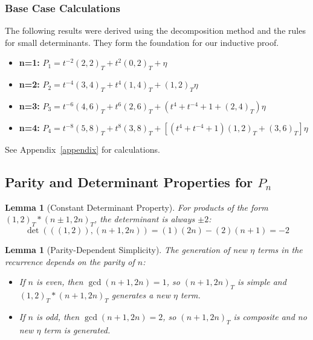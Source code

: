 \documentclass[12pt]{article}
\newtheorem{lemma}[theorem]{Lemma}
\begin{document}
\subsubsection*{Base Case Calculations}
The following results were derived using the decomposition method and the rules for small determinants. They form the foundation for our inductive proof.

\begin{itemize}
    \item \textbf{n=1:} $P_1 = t^{-2}(2,2)_T + t^{2}(0,2)_T + \eta$
    \item \textbf{n=2:} $P_2 = t^{-4}(3,4)_T + t^{4}(1,4)_T + (1,2)_T\eta$
    \item \textbf{n=3:} $P_3 = t^{-6}(4,6)_T + t^{6}(2,6)_T + (t^4 + t^{-4} + 1 + (2,4)_T)\eta$
    \item \textbf{n=4:} $P_4 = t^{-8}(5,8)_T + t^{8}(3,8)_T + [ (t^4 + t^{-4} + 1)(1,2)_T + (3,6)_T ]\eta$
\end{itemize}
See Appendix~\ref{appendix} for calculations.



\subsection{Parity and Determinant Properties for $P_n$}
\begin{lemma}[Constant Determinant Property]\label{lem:property}
For products of the form $(1,2)_T \ast (n \pm 1, 2n)_T$, the determinant is always $\pm 2$:
\begin{equation}
\det(((1,2)), (n+1, 2n)) = (1)(2n) - (2)(n+1) = -2
\end{equation}
\end{lemma}

\begin{lemma}[Parity-Dependent Simplicity]\label{lem:parity}
The generation of new $\eta$ terms in the recurrence depends on the parity of $n$:
\begin{itemize}
    \item If $n$ is even, then $\gcd(n+1, 2n) = 1$, so $(n+1, 2n)_T$ is simple and $(1,2)_T \ast (n+1, 2n)_T$ generates a new $\eta$ term.
    \item If $n$ is odd, then $\gcd(n+1, 2n) = 2$, so $(n+1, 2n)_T$ is composite and no new $\eta$ term is generated.
\end{itemize}
\end{lemma}
\end{document}

